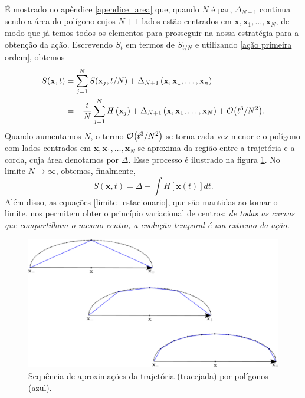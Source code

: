 \documentclass[
	12pt,
	oneside,			%
	a4paper,			%
	english,			%
	brazil				%
	]{abntex2}
\theoremstyle{definition}
\begin{document}
É mostrado no apêndice \ref{apendice_area} que, quando $N$ é par, $\Delta_{N+1}$ continua sendo a área do polígono cujos $N+1$ lados estão centrados em $\mathbf{x},\mathbf{x}_1, \ldots, \mathbf{x}_N$, de modo que já temos todos os elementos para prosseguir na nossa estratégia para a obtenção da ação. Escrevendo $S_t$ em termos de $S_{t/N}$ e utilizando \eqref{ação primeira ordem}, obtemos
\begin{equation}
    \begin{aligned}
        S(\mathbf{x},t) &= \sum_{j=1}^N S(\mathbf{x}_j,t/N) + \Delta_{N+1}\left(\mathbf{x},\mathbf{x}_1,\ldots,\mathbf{x}_n\right) \\
        &=-\frac{t}{N}\sum_{j=1}^N H\left(\mathbf{x}_j\right) + \Delta_{N+1}\left(\mathbf{x},\mathbf{x}_1,\ldots,\mathbf{x}_N\right) + \order{t^3/N^2} .
    \end{aligned}
\end{equation}
Quando aumentamos $N$, o termo $\order{t^3/N^2}$ se torna cada vez menor e o polígono com lados centrados em $\mathbf{x},\mathbf{x}_1,\ldots,\mathbf{x}_N$ se aproxima da região entre a trajetória e a corda, cuja área denotamos por $\Delta$. Esse processo é ilustrado na figura \ref{aproximação_trajetória_poligonos}. No limite $N\to \infty$, obtemos, finalmente,
\begin{equation}
\label{ação}
    S(\mathbf{x},t) = \Delta - \int H \left[\mathbf{x}(t)\right] dt. 
\end{equation}
Além disso, as equações \eqref{limite_estacionario}, que são mantidas ao tomar o limite, nos permitem obter o princípio variacional de centros: \textit{de todas as curvas que compartilham o mesmo centro, a evolução temporal é um extremo da ação.}

\begin{figure}[H]
    \includegraphics[width=\textwidth]{Imagens/trajetóriav2.png}
    \centering
    \caption{Sequência de aproximações da trajetória (tracejada) por polígonos (azul).}
    \label{aproximação_trajetória_poligonos}
\end{figure}
\end{document}
